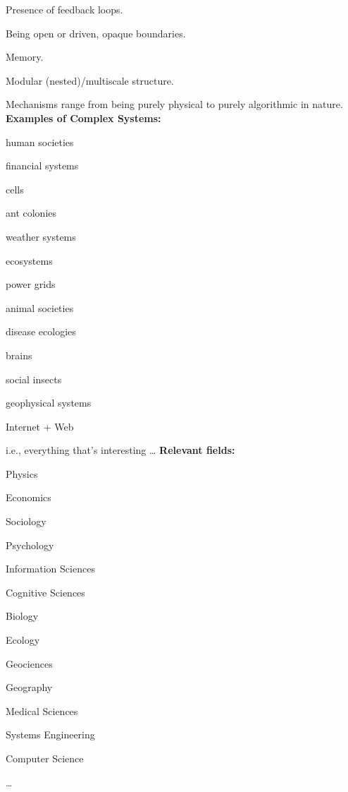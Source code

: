       Presence of feedback loops.
    
      Being open or driven, opaque boundaries.
    
      Memory.
    
      Modular (nested)/multiscale structure.
    
      Mechanisms range from being purely physical to purely algorithmic in nature.
  \textbf{Examples of Complex Systems:}
    
        
          human societies 
        
          financial systems
        
          cells     
        
          ant colonies 
        
          weather systems 
        
          ecosystems     
        
          power grids
      
          animal societies     
        
          disease ecologies    
        
          brains               
        
          social insects       
        
          geophysical systems  
        
          Internet + Web
    
  
  
    i.e., everything that's interesting \ldots
  \textbf{Relevant fields:}
    
       
        Physics
       
        Economics
       
        Sociology
       
        Psychology
       
        Information Sciences
      
        Cognitive Sciences
       
        Biology
       
        Ecology
       
        Geociences
       
        Geography
      
        Medical Sciences
       
        Systems Engineering
       
        Computer Science
       
      \ldots
  
